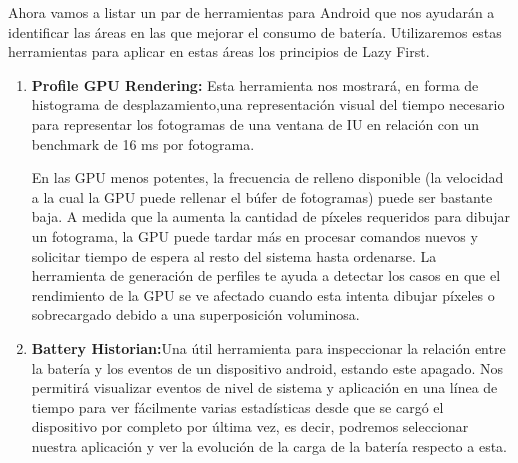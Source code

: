 Ahora vamos a listar un par de herramientas para Android que nos ayudarán a identificar las áreas en las que mejorar el consumo de batería. Utilizaremos estas herramientas para aplicar en estas áreas los principios de Lazy First.

\begin{enumerate}
\item \textbf{Profile GPU Rendering:} Esta herramienta nos mostrará, en forma de histograma de desplazamiento,una representación visual del tiempo necesario para representar los fotogramas de una ventana de IU en relación con un benchmark de 16 ms por fotograma.

En las GPU menos potentes, la frecuencia de relleno disponible (la velocidad a la cual la GPU puede rellenar el búfer de fotogramas) puede ser bastante baja. A medida que la aumenta la cantidad de píxeles requeridos para dibujar un fotograma, la GPU puede tardar más en procesar comandos nuevos y solicitar tiempo de espera al resto del sistema hasta ordenarse. La herramienta de generación de perfiles te ayuda a detectar los casos en que el rendimiento de la GPU se ve afectado cuando esta intenta dibujar píxeles o sobrecargado debido a una superposición voluminosa.
\item \textbf{Battery Historian:}Una útil herramienta para inspeccionar la relación entre la batería y los eventos de un dispositivo android, estando este apagado. Nos permitirá visualizar eventos de nivel de sistema y aplicación en una línea de tiempo para ver fácilmente varias estadísticas desde que se cargó el dispositivo por completo por última vez, es decir, podremos seleccionar nuestra aplicación y ver la evolución de la carga de la batería respecto a esta.\cite{BATTERYHISTORIAN}

\end{enumerate}